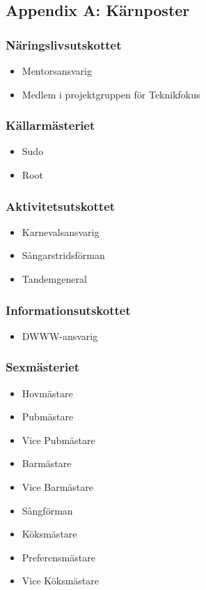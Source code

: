 \documentclass{dsekkallelse}
\begin{document}
\subsection{Appendix A: Kärnposter}
\begin{multicols}{2}

\subsubsection{Näringslivsutskottet}
\begin{itemize}
    \item Mentorsansvarig
    \item Medlem i projektgruppen för Teknikfokus 
\end{itemize}

\subsubsection{Källarmästeriet}
\begin{itemize}
    \item Sudo
    \item Root
\end{itemize}

\subsubsection{Aktivitetsutskottet}
 \begin{itemize}
     \item Karnevalsansvarig
     \item Sångarstridsförman
     \item Tandemgeneral
 \end{itemize}
 
\subsubsection{Informationsutskottet}
\begin{itemize}
    \item DWWW-ansvarig
\end{itemize}
 
 \subsubsection{Sexmästeriet}
\begin{itemize}
    \item Hovmästare
    \item Pubmästare
    \item Vice Pubmästare
    \item Barmästare
    \item Vice Barmästare
    \item Sångförman
    \item Köksmästare
    \item Preferensmästare
    \item Vice Köksmästare
\end{itemize}


\end{multicols}
\end{document}
